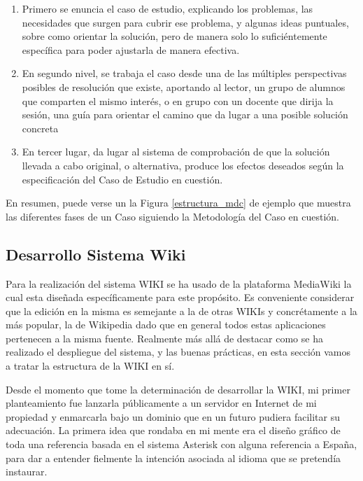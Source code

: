 \begin{enumerate}
	\item Primero se enuncia el caso de estudio, explicando los problemas, las necesidades que surgen para cubrir ese problema, y algunas ideas puntuales, sobre como orientar la solución, pero de manera solo lo suficiéntemente específica para poder ajustarla de manera efectiva.
	\item En segundo nivel, se trabaja el caso desde una de las múltiples perspectivas posibles de resolución que existe, aportando al lector, un grupo de alumnos que comparten el mismo interés, o en grupo con un docente que dirija la sesión, una guía para orientar el camino que da lugar a una posible solución concreta
	\item En tercer lugar, da lugar al sistema de comprobación de que la solución llevada a cabo original, o alternativa, produce los efectos deseados según la especificación del Caso de Estudio en cuestión.
\end{enumerate}

En resumen, puede verse un la Figura \ref{estructura_mdc} de ejemplo que muestra las diferentes fases de un Caso siguiendo la Metodología del Caso en cuestión.


\subsection{Desarrollo Sistema Wiki}

Para la realización del sistema WIKI se ha usado de la plataforma MediaWiki la cual esta diseñada específicamente para este propósito. Es conveniente considerar que la edición en la misma es semejante a la de otras WIKIs y concrétamente a la más popular, la de Wikipedia dado que en general todos estas aplicaciones pertenecen a la misma fuente. Realmente más allá de destacar como se ha realizado el despliegue del sistema, y las buenas prácticas, en esta sección vamos a tratar la estructura de la WIKI en sí.

Desde el momento que tome la determinación de desarrollar la WIKI, mi primer planteamiento fue lanzarla públicamente a un servidor en Internet de mi propiedad y enmarcarla bajo un dominio que en un futuro pudiera facilitar su adecuación. La primera idea que rondaba en mi mente era el diseño gráfico de toda una referencia basada en el sistema Asterisk con alguna referencia a España, para dar a entender fielmente la intención asociada al idioma que se pretendía instaurar.

